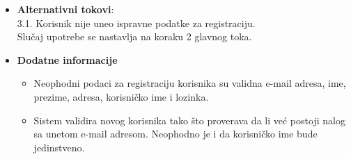 \begin {itemize}
\item \textbf {Alternativni tokovi}: \\
 3.1. Korisnik nije uneo ispravne podatke za registraciju.\\
 Slučaj upotrebe se nastavlja na koraku 2 glavnog toka.
\end{itemize}
 \begin{itemize} 
    \item \textbf{Dodatne informacije}
    \begin{itemize}
        \item Neophodni podaci za registraciju korisnika su validna e-mail adresa, ime, prezime, adresa, korisničko ime i lozinka.
        \item Sistem validira novog korisnika tako što proverava da li već postoji nalog sa unetom e-mail adresom. Neophodno je i da korisničko ime bude jedinstveno.
    \end{itemize}
\end{itemize}
 
 
